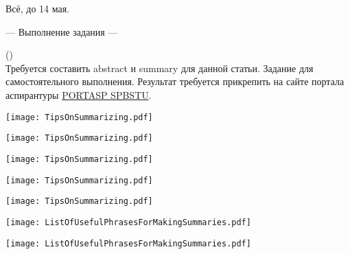 \documentclass[main.tex]{subfiles}
\begin{document}
Всё, до 14 мая.

\newpage
{}

\hypertarget{ltask:2024-04-24-2}{--- Выполнение задания ---} (\hyperref[task:2024-04-24-2]{\color{blue}{перейти к тексту задания}})
\\

Требуется составить abstract и summary для данной статьи.
Задание для самостоятельного выполнения.
Результат требуется прикрепить на сайте портала аспирантуры \href{https://portasp.spbstu.ru/login/index.php}{PORTASP SPBSTU}.


\newpage
{}
\label{subsec:tips-on-summarizing}

{\parindent25pt\texttt{[image: TipsOnSummarizing.pdf]}}\newpage

{\parindent25pt\texttt{[image: TipsOnSummarizing.pdf]}}\newpage

{\parindent25pt\texttt{[image: TipsOnSummarizing.pdf]}}\newpage

{\parindent25pt\texttt{[image: TipsOnSummarizing.pdf]}}\newpage

{\parindent25pt\texttt{[image: TipsOnSummarizing.pdf]}}


\newpage
{}
\label{subsec:list-of-useful-phrases-for-making-summaries}

{\parindent25pt\texttt{[image: ListOfUsefulPhrasesForMakingSummaries.pdf]}}\newpage

{\parindent25pt\texttt{[image: ListOfUsefulPhrasesForMakingSummaries.pdf]}}
\end{document}
